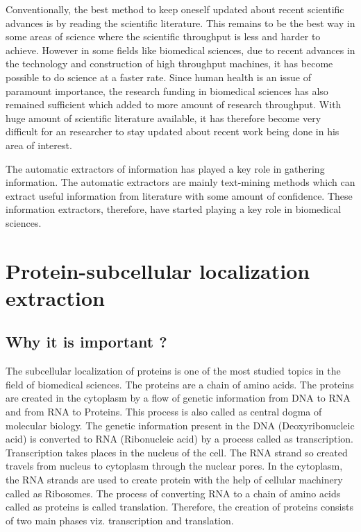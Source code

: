 Conventionally, the best method to keep oneself updated about recent scientific advances is by reading the scientific literature. This remains to be the best way in some areas of science where the scientific throughput is less and harder to achieve. However in some fields like biomedical sciences, due to recent advances in the technology and construction of high throughput machines, it has become possible to do science at a faster rate. Since human health is an issue of paramount importance, the research funding in biomedical sciences has also remained sufficient which added to more amount of research throughput. With huge amount of scientific literature available, it has therefore become very difficult for an researcher to stay updated about recent work being done in his area of interest.

The automatic extractors of information has played a key role in gathering information. The automatic extractors are mainly text-mining methods which can extract useful information from literature with some amount of confidence. These information extractors, therefore, have started playing a key role in biomedical sciences.


\section{Protein-subcellular localization extraction}

\subsection*{Why it is important ?}

The subcellular localization of proteins is one of the most studied topics in the field of biomedical sciences. The proteins are a chain of amino acids. The proteins are created in the cytoplasm by a flow of genetic information from DNA to RNA and from RNA to Proteins. This process is also called as central dogma of molecular biology. The genetic information present in the DNA (Deoxyribonucleic acid) is converted to RNA (Ribonucleic acid) by a process called as transcription. Transcription takes places in the nucleus of the cell. The RNA strand so created travels from nucleus to cytoplasm through the nuclear pores. In the cytoplasm, the RNA strands are used to create protein with the help of cellular machinery called as Ribosomes. The process of converting RNA to a chain of amino acids called as proteins is called translation. Therefore, the creation of proteins consists of two main phases viz. transcription and translation. 

